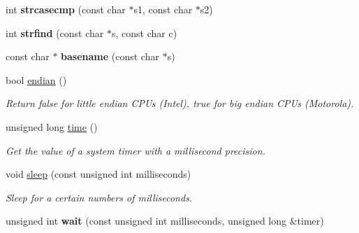 \begin{DoxyCompactItemize}
\item 
\hypertarget{namespacecimg__library_1_1cimg_acc46f540ac830d8ea966da95d4d618f6}{int {\bfseries strcasecmp} (const char $\ast$s1, const char $\ast$s2)}\label{namespacecimg__library_1_1cimg_acc46f540ac830d8ea966da95d4d618f6}

\item 
\hypertarget{namespacecimg__library_1_1cimg_a979e920469e2ac90140fbdb70af0cfd8}{int {\bfseries strfind} (const char $\ast$s, const char c)}\label{namespacecimg__library_1_1cimg_a979e920469e2ac90140fbdb70af0cfd8}

\item 
\hypertarget{namespacecimg__library_1_1cimg_a1bc01331ce0d8b220644830d027019a0}{const char $\ast$ {\bfseries basename} (const char $\ast$s)}\label{namespacecimg__library_1_1cimg_a1bc01331ce0d8b220644830d027019a0}

\item 
\hypertarget{namespacecimg__library_1_1cimg_ac01790460808876967d2ba371a000cee}{bool \hyperlink{namespacecimg__library_1_1cimg_ac01790460808876967d2ba371a000cee}{endian} ()}\label{namespacecimg__library_1_1cimg_ac01790460808876967d2ba371a000cee}

\begin{DoxyCompactList}\small\item\em Return {\ttfamily false} for little endian C\-P\-Us (Intel), {\ttfamily true} for big endian C\-P\-Us (Motorola). \end{DoxyCompactList}\item 
\hypertarget{namespacecimg__library_1_1cimg_af883131bbc64e996d212114cc2b2b21a}{unsigned long \hyperlink{namespacecimg__library_1_1cimg_af883131bbc64e996d212114cc2b2b21a}{time} ()}\label{namespacecimg__library_1_1cimg_af883131bbc64e996d212114cc2b2b21a}

\begin{DoxyCompactList}\small\item\em Get the value of a system timer with a millisecond precision. \end{DoxyCompactList}\item 
void \hyperlink{namespacecimg__library_1_1cimg_a3ac7655e49556a90715f3532af221334}{sleep} (const unsigned int milliseconds)
\begin{DoxyCompactList}\small\item\em Sleep for a certain numbers of milliseconds. \end{DoxyCompactList}\item 
\hypertarget{namespacecimg__library_1_1cimg_a011234136eeddefb37bb8d1e1f74cac3}{unsigned int {\bfseries wait} (const unsigned int milliseconds, unsigned long \&timer)}\label{namespacecimg__library_1_1cimg_a011234136eeddefb37bb8d1e1f74cac3}


\end{DoxyCompactItemize}
